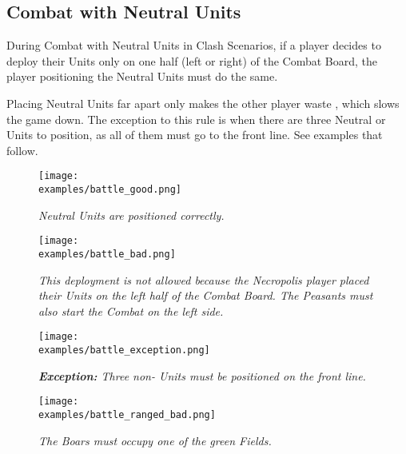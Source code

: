 \begin{multicols}{2}

\subsection*{Combat with Neutral Units}

During Combat with Neutral Units in Clash Scenarios, if a player decides to deploy their Units only on one half (left or right) of the Combat Board, the player positioning the Neutral Units must do the same.

Placing Neutral Units far apart only makes the other player waste , which slows the game down.
The exception to this rule is when there are three Neutral  or  Units to position, as all of them must go to the front line.
See examples that follow.

\begin{center}
\end{center}

\end{multicols}

\begin{figure*}[!h]
  \mbox{}
  \hfill
  \begin{minipage}[t]{0.44\textwidth}
    \centering
    \texttt{[image: \\examples/battle\_good.png]}
    \caption[good protected]{\textit{Neutral Units are positioned correctly.}}
  \end{minipage}
  \hfill
  \begin{minipage}[t]{0.44\textwidth}
    \centering
    \texttt{[image: \\examples/battle\_bad.png]}
    \caption[bad protected]{\textit{This deployment is not allowed because the Necropolis player placed their Units on the left half of the Combat Board.
      The Peasants must also start the Combat on the left side.}}
  \end{minipage}
  \hfill
  \mbox{}
\end{figure*}

\clearpage

\begin{figure*}[!h]
  \mbox{}
  \hfill
  \begin{minipage}[t]{0.44\textwidth}
    \centering
    \texttt{[image: \\examples/battle\_exception.png]}
    \caption[exception protected]{\textit{\textbf{Exception:} Three non- Units must be positioned on the front line.}}
  \end{minipage}
  \hfill
  \begin{minipage}[t]{0.44\textwidth}
    \centering
    \texttt{[image: \\examples/battle\_ranged\_bad.png]}
    \caption[ranged protected]{\textit{The Boars must occupy one of the green Fields.}}
  \end{minipage}
  \hfill
  \mbox{}
\end{figure*}

